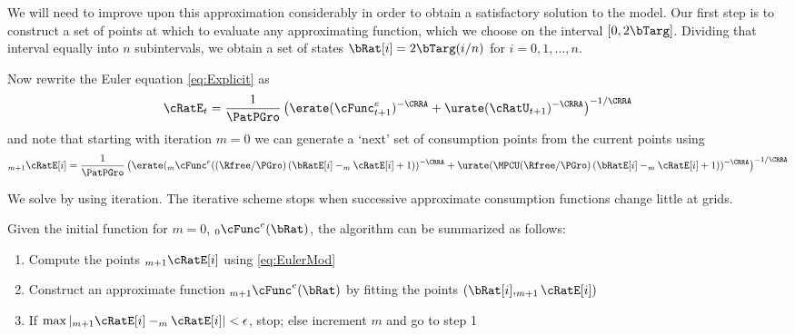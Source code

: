 \documentclass[titlepage]{\econtex}\newcommand{\texname}{cjSOE}
\begin{document}
We will need to improve upon this approximation considerably in order
to obtain a satisfactory solution to the model.  Our first step is to
construct a set of points at which to evaluate any approximating function, which
we choose on the interval $[0,2\bTarg]$. Dividing that interval equally into $n$ subintervals, we
obtain a set of states $\bRat[i]=2 \bTarg (i/n)$ for $i=0,1,...,n$.

Now rewrite the Euler equation \eqref{eq:Explicit} as
\begin{equation*}
    \cRatE_t= \frac{1}{\PatPGro }\left( \erate (\cFunc^{e}_{t+1})^{-\CRRA}+\urate (\cRatU_{t+1})^{-\CRRA} \right)^{-1/\CRRA}
\end{equation*}
and note that starting with iteration $m=0$ we can generate a `next' set of consumption points from the current points using
\begin{equation}
    _{m+1}\cRatE[i]= \frac{1}{\PatPGro }\left( \erate (_{m}\cFunc^{e}((\Rfree/\PGro)\left(\bRatE[i] -_{m}\cRatE[i]+1\right))^{-\CRRA}+\urate (\MPCU (\Rfree/\PGro)\left(\bRatE[i] -_{m}\cRatE[i]+1\right))^{-\CRRA} \right)^{-1/\CRRA}
\label{eq:EulerMod}
\end{equation}

We solve by using iteration. The iterative scheme stops when
successive approximate consumption functions change little at grids.

Given the initial function for $m=0$, $_{0}\cFunc^{e}(\bRat)$, the algorithm can be summarized as follows:
\begin{enumerate}
  \item Compute the points $_{m+1}\cRatE[i]$ using \eqref{eq:EulerMod}
  \item Construct an approximate function $_{m+1}\cFunc^{e}(\bRat)$ by fitting the points $(\bRat[i],_{m+1}\cRatE[i])$
  \item If $\max|_{m+1}\cRatE[i]-_{m}\cRatE[i]|<\epsilon$, stop; else increment $m$ and go to step 1
  \end{enumerate}

  
\newpage


\end{document}
